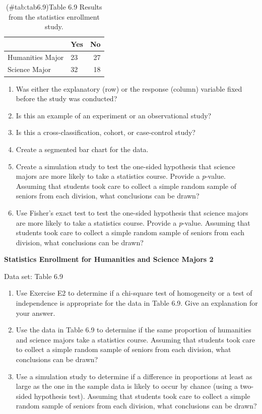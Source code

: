 \documentclass[
]{report}
\begin{document}
\begin{list}{E.}{ \setlength{\itemsep}{0.5em}}
\begin{table}[!h]
\centering
\caption{(\#tab:tab6.9)Table 6.9 Results from the statistics enrollment study.}
\centering
\begin{tabular}[t]{llr}
\toprule
  & Yes & No\\
\midrule
Humanities Major & 23 & 27\\
Science Major & 32 & 18\\
\bottomrule
\end{tabular}
\end{table}



  \begin{enumerate}
    \item Was either the explanatory (row) or the response (column) variable fixed before the study was conducted?
    \item Is this an example of an experiment or an observational study?
    \item Is this a cross-classification, cohort, or case-control study?
    \item Create a segmented bar chart for the data.
    \item Create a simulation study to test the one-sided hypothesis that science majors are more likely to take a statistics course. Provide a \textit{p}-value. Assuming that students took care to collect a simple random sample of seniors from each division, what conclusions can be drawn?
    \item Use Fisher’s exact test to test the one-sided hypothesis that science majors are more likely to take a statistics course. Provide a \textit{p}-value. Assuming that students took care to collect a simple random sample of seniors from each division, what conclusions can be drawn?
  \end{enumerate}

  \item \textbf{Statistics Enrollment for Humanities and Science Majors 2}    

  Data set: Table 6.9    
  \begin{enumerate}
    \item Use Exercise E2 to determine if a chi-square test of homogeneity or a test of independence is appropriate for the data in Table 6.9. Give an explanation for your answer.
    \item Use the data in Table 6.9 to determine if the same proportion of humanities and science majors take a statistics course. Assuming that students took care to collect a simple random sample of seniors from each division, what conclusions can be drawn?
    \item Use a simulation study to determine if a difference in proportions at least as large as the one in the sample data is likely to occur by chance (using a two-sided hypothesis test). Assuming that students took care to collect a simple random sample of seniors from each division, what conclusions can be drawn?
  \end{enumerate}


\end{list}
\end{document}
